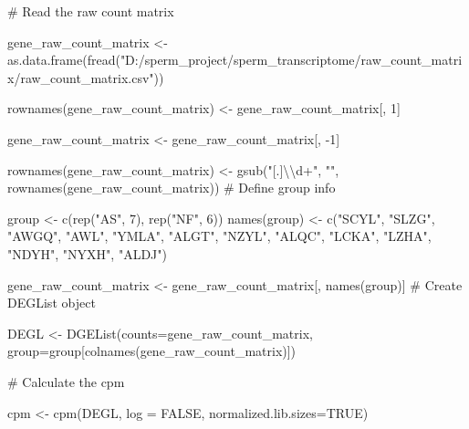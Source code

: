 \documentclass[
  letterpaper,
  DIV=11,
  numbers=noendperiod]{scrreprt}
\newenvironment{Shaded}{\begin{snugshade}}{\end{snugshade}}
\newcommand{\AttributeTok}[1]{\textcolor[rgb]{0.40,0.45,0.13}{#1}}
\newcommand{\CommentTok}[1]{\textcolor[rgb]{0.37,0.37,0.37}{#1}}
\newcommand{\ConstantTok}[1]{\textcolor[rgb]{0.56,0.35,0.01}{#1}}
\newcommand{\DecValTok}[1]{\textcolor[rgb]{0.68,0.00,0.00}{#1}}
\newcommand{\FunctionTok}[1]{\textcolor[rgb]{0.28,0.35,0.67}{#1}}
\newcommand{\NormalTok}[1]{\textcolor[rgb]{0.00,0.23,0.31}{#1}}
\newcommand{\OtherTok}[1]{\textcolor[rgb]{0.00,0.23,0.31}{#1}}
\newcommand{\SpecialCharTok}[1]{\textcolor[rgb]{0.37,0.37,0.37}{#1}}
\newcommand{\StringTok}[1]{\textcolor[rgb]{0.13,0.47,0.30}{#1}}
\begin{document}
\begin{codelisting}
\begin{Shaded}
\begin{Highlighting}[]
\CommentTok{\# Read the raw count matrix}

\NormalTok{gene\_raw\_count\_matrix }\OtherTok{\textless{}{-}} \FunctionTok{as.data.frame}\NormalTok{(}\FunctionTok{fread}\NormalTok{(}\StringTok{"D:/sperm\_project/sperm\_transcriptome/raw\_count\_matrix/raw\_count\_matrix.csv"}\NormalTok{))}

\FunctionTok{rownames}\NormalTok{(gene\_raw\_count\_matrix) }\OtherTok{\textless{}{-}}\NormalTok{ gene\_raw\_count\_matrix[, }\DecValTok{1}\NormalTok{]}

\NormalTok{gene\_raw\_count\_matrix }\OtherTok{\textless{}{-}}\NormalTok{ gene\_raw\_count\_matrix[, }\SpecialCharTok{{-}}\DecValTok{1}\NormalTok{]  }

\FunctionTok{rownames}\NormalTok{(gene\_raw\_count\_matrix) }\OtherTok{\textless{}{-}} \FunctionTok{gsub}\NormalTok{(}\StringTok{"[.]}\SpecialCharTok{\textbackslash{}\textbackslash{}}\StringTok{d+"}\NormalTok{, }\StringTok{""}\NormalTok{, }\FunctionTok{rownames}\NormalTok{(gene\_raw\_count\_matrix))}
\CommentTok{\# Define group info}

\NormalTok{group }\OtherTok{\textless{}{-}} \FunctionTok{c}\NormalTok{(}\FunctionTok{rep}\NormalTok{(}\StringTok{"AS"}\NormalTok{, }\DecValTok{7}\NormalTok{), }\FunctionTok{rep}\NormalTok{(}\StringTok{"NF"}\NormalTok{, }\DecValTok{6}\NormalTok{))}
\FunctionTok{names}\NormalTok{(group) }\OtherTok{\textless{}{-}} \FunctionTok{c}\NormalTok{(}\StringTok{"SCYL"}\NormalTok{, }\StringTok{"SLZG"}\NormalTok{, }\StringTok{"AWGQ"}\NormalTok{, }\StringTok{"AWL"}\NormalTok{, }\StringTok{"YMLA"}\NormalTok{, }\StringTok{"ALGT"}\NormalTok{, }\StringTok{"NZYL"}\NormalTok{, }\StringTok{"ALQC"}\NormalTok{, }\StringTok{"LCKA"}\NormalTok{, }\StringTok{"LZHA"}\NormalTok{, }\StringTok{"NDYH"}\NormalTok{, }\StringTok{"NYXH"}\NormalTok{, }\StringTok{"ALDJ"}\NormalTok{)}

\NormalTok{gene\_raw\_count\_matrix }\OtherTok{\textless{}{-}}\NormalTok{ gene\_raw\_count\_matrix[, }\FunctionTok{names}\NormalTok{(group)]}
\CommentTok{\# Create DEGList object}

\NormalTok{DEGL }\OtherTok{\textless{}{-}} \FunctionTok{DGEList}\NormalTok{(}\AttributeTok{counts=}\NormalTok{gene\_raw\_count\_matrix, }\AttributeTok{group=}\NormalTok{group[}\FunctionTok{colnames}\NormalTok{(gene\_raw\_count\_matrix)])}

\CommentTok{\# Calculate the cpm}

\NormalTok{cpm }\OtherTok{\textless{}{-}} \FunctionTok{cpm}\NormalTok{(DEGL, }\AttributeTok{log =} \ConstantTok{FALSE}\NormalTok{, }\AttributeTok{normalized.lib.sizes=}\ConstantTok{TRUE}\NormalTok{)}


\end{Highlighting}
\end{Shaded}
\end{codelisting}
\end{document}
